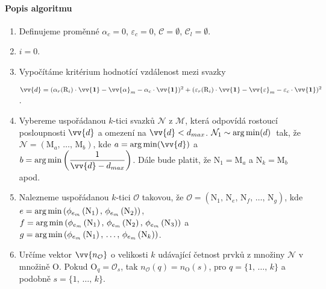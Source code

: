 \paragraph{Popis algoritmu} 

\begin{enumerate}
\item Definujeme proměnné $\alpha_{c} = 0$, $\varepsilon_{c} = 0$, $\mathcal{C} = \emptyset$, $\mathcal{C}_{l} = \emptyset$.

\item $i = 0$.

\item Vypočítáme kritérium hodnotící vzdálenost mezi svazky 

$\vv{d} = (\alpha_{r}(\mathrm{R}_i)\cdot\vv{\mathbf{1}}-\vv{\alpha}_{m}-\alpha_{c}\cdot\vv{\mathbf{1}})^2 + (\varepsilon_{r}(\mathrm{R}_i)\cdot\vv{\mathbf{1}}-\vv{\varepsilon}_{m}-\varepsilon_{c}\cdot\vv{\mathbf{1}})^2 $.

\item Vybereme uspořádanou $k$-tici svazků $\mathcal{N}$ z $\mathcal{M}$, která odpovídá rostoucí posloupnosti $\vv{d}$ a omezení na $\vv{d} < d_{max}$. $\mathcal{N}_1 \sim \operatorname*{arg\,min}(d)\,$ tak, že $\mathcal{N} = \left(\mathrm{M}_a ,\,\dots,\, \mathrm{M}_b \right)$, kde $a = \argmin(\vv{d})$ a $b = \argmin\left(\dfrac{1}{\vv{d}-d_{max}}\right)$. Dále bude platit, že  $\mathrm{N}_1 = \mathrm{M}_a$ a $\mathrm{N}_k = \mathrm{M}_b$ apod. 

\item Nalezneme uspořádanou $k$-tici $\mathcal{O}$ takovou, že $\mathcal{O} = \left(\mathrm{N}_1 ,\,\mathrm{N}_e,\,\mathrm{N}_f ,\,\dots,\, \mathrm{N}_g \right)$, kde\\$e = \operatorname*{arg\,min}\left( \phi_{e_{m}}\left(\mathrm{N}_1 \right),\, \phi_{e_{m}}\left(\mathrm{N}_2 \right)  \right)$, $f = \operatorname*{arg\,min}\left( \phi_{e_{m}}\left(\mathrm{N}_1 \right),\, \phi_{e_{m}}\left(\mathrm{N}_2 \right),\, \phi_{e_{m}}\left(\mathrm{N}_3 \right)   \right)$ a \\  $g = \operatorname*{arg\,min}\left( \phi_{e_{m}}\left(\mathrm{N}_1 \right),\,\dots,\, \phi_{e_{m}}\left(\mathrm{N}_k \right)  \right)$.  

\item Určíme vektor $\vv{n_\mathcal{O}}$ o velikosti $k$ udávající četnost prvků z množiny $\mathcal{N}$ v množině $\mathrm{O}$. Pokud $\mathrm{O}_q = \mathcal{O}_s$, tak $n_{\mathcal{O}}(q) = n_{\mathrm{O}}(s)$, pro $q = \lbrace1,\,\dots,\,k \rbrace$ a podobně $s = \lbrace 1,\,\dots,\,k \rbrace$.


\end{enumerate}
